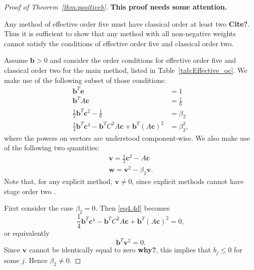 
\begin{proof}[Proof of Theorem~\ref{thm:positiveb}]
    {\bf This proof needs some attention.}

    Any method of effective order five must have classical order at least two {\bf Cite?}.
    Thus it is sufficient to show that any method with all non-negative weights
    cannot satisfy the conditions of effective order five and classical order two.

    Assume $\bm{b}>0$ and consider the order conditions for effective order five and classical order two for the main method, listed in Table~\ref{tab:Effective_oc}.  We make use of the following subset of those conditions:
    \begin{subequations}\label{eq4.4}
        \begin{align}
            \bm{b}^{T}\bm{e} &= 1 \label{eq4.4a} \\
            \bm{b}^{T}A\bm{c} &= \frac{1}{6} \label{eq4.4b} \\
            \frac{1}{2}\bm{b}^{T}\bm{c}^{2} - \frac{1}{6} &= \beta_{2} \label{eq4.4c} \\
            \frac{1}{4}\bm{b}^{T}\bm{c}^{4} - \bm{b}^{T}C^{2}A\bm{c} + \bm{b}^{T}(A\bm{c})^{2} &= \beta_{2}^{2}, \label{eq4.4d}
        \end{align}
    \end{subequations}
    where the powers on vectors are understood component-wise. 
    We also make use of the following two quantities:
    \begin{align*} 
        \bm{v} = \frac{1}{2}\bm{c}^{2} - A\bm{c} \\
        \bm{w} = \bm{v}^{2} - \beta_{2}\bm{v}.
    \end{align*}
    Note that, for any explicit method, $\bm{v}\ne 0$, since explicit methods
    cannot have stage order two \cite{}.

    First consider the case $\beta_2 = 0$.
    Then \eqref{eq4.4d} becomes
    \begin{equation*}
        \frac{1}{4}\bm{b}^{T}\bm{c}^{4} - \bm{b}^{T}C^{2}A\bm{c} + \bm{b}^{T}(A\bm{c})^{2} = 0,
    \end{equation*}
    or equivalently
    \begin{equation*}
        \bm{b}^{T}\bm{v}^{2} = 0.
    \end{equation*}
    Since \( \bm{v} \) cannot be identically equal to zero {\bf why?}, this implies that $b_j\le0$ for some $j$.
    Hence $\beta_2\ne0$.


\end{proof}

